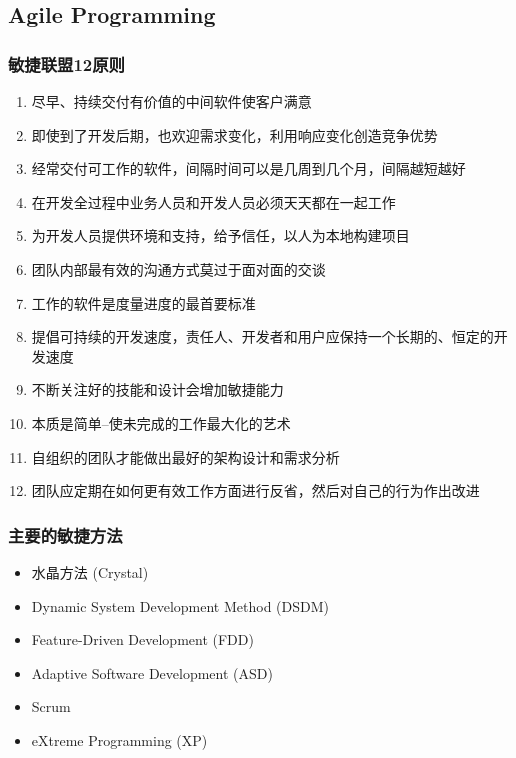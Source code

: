 \subsection{Agile Programming}
\begin{frame}
  \frametitle{敏捷联盟12原则}
  \begin{enumerate}
    \item 尽早、持续交付有价值的中间软件使客户满意
    \item 即使到了开发后期，也欢迎需求变化，利用响应变化创造竞争优势
    \item 经常交付可工作的软件，间隔时间可以是几周到几个月，间隔越短越好
    \item 在开发全过程中业务人员和开发人员必须天天都在一起工作
    \item 为开发人员提供环境和支持，给予信任，以人为本地构建项目
    \item 团队内部最有效的沟通方式莫过于面对面的交谈
    \item 工作的软件是度量进度的最首要标准
    \item 提倡可持续的开发速度，责任人、开发者和用户应保持一个长期的、恒定的开发速度
    \item 不断关注好的技能和设计会增加敏捷能力
    \item 本质是简单--使未完成的工作最大化的艺术
    \item 自组织的团队才能做出最好的架构设计和需求分析
    \item 团队应定期在如何更有效工作方面进行反省，然后对自己的行为作出改进
  \end{enumerate}
\end{frame}

\begin{frame}
  \frametitle{主要的敏捷方法}
  \begin{itemize}
    \item<+-> 水晶方法 (Crystal)
    \item<+-> Dynamic System Development Method (DSDM)
    \item<+-> Feature-Driven Development (FDD)
    \item<+-> Adaptive Software Development (ASD)
    \item<+-> Scrum
    \item<+-> \alert{eXtreme Programming (XP)}
  \end{itemize}
\end{frame}

